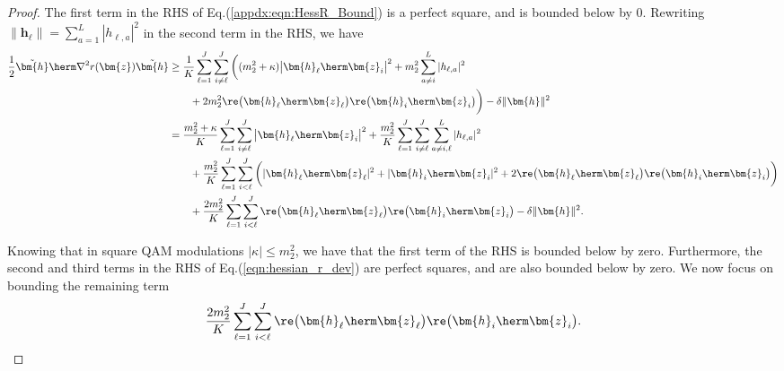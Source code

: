 \begin{proof}
The first term in the RHS of Eq.(\ref{appdx:eqn:HessR_Bound}) is a perfect square, and is bounded below by 0. Rewriting $\|\bm{h}_{\ell}\|=\sum_{a=1}^L|{h}_{{\ell},a}|^2$ in the second term in the RHS, we have
\begin{align}
	\frac{1}{2}\tilde{\bm{h}}\herm\nabla^2 r(\bm{z})\tilde{\bm{h}}
	&\geq\frac{1}{K}\sum_{{\ell}=1}^J  \sum_{i\neq {\ell}}^J\bigg( (m_2^2+
	\kappa)\big|\bm{h}_{\ell}\herm\bm{z}_i\big|^2 +m_2^2\sum_{a\neq i}^L|{h}_{{\ell},a}|^2
	\nonumber\\
	&\qquad +2m_2^2\re\big(\bm{h}_{\ell}\herm \bm{z}_{\ell}\big)\re\big(\bm{h}_i\herm\bm{z}_i\big)\bigg)
	-\delta\|\bm{h}\|^2\nonumber\\
	&=\frac{m_2^2+
		\kappa}{K}\sum_{{\ell}=1}^J\sum_{i\neq {\ell}}^J\big|\bm{h}_{\ell}\herm\bm{z}_i\big|^2 +\frac{m_2^2}{K}
	\sum_{{\ell}=1}^J\sum_{i\neq {\ell}}^J
	\sum_{a\neq i,{\ell}}
	^L|{h}_{{\ell},a}|^2 
		\nonumber\\&\qquad
	+\frac{m_2^2}{K}
	\sum_{{\ell}=1}^J\sum_{i<{\ell}}^J\bigg(|\bm{h}_{\ell}\herm\bm{z}_{\ell}|^2+|\bm{h}_i\herm\bm{z}_i|^2+2\re\big(\bm{h}_{\ell}\herm \bm{z}_{\ell}\big)\re\big(\bm{h}_i\herm\bm{z}_i\big)\bigg)
	\nonumber\\&\qquad
	+\frac{2m_2^2}{K}
	\sum_{{\ell}=1}^J\sum_{i<{\ell}}^J\re\big(\bm{h}_{\ell}\herm \bm{z}_{\ell}\big)\re\big(\bm{h}_i\herm\bm{z}_i\big)
	-\delta\|\bm{h}\|^2.\label{eqn:hessian_r_dev}
\end{align}


Knowing that in square QAM modulations $|\kappa|\leq m_2^2$, we have that the first term of the RHS is bounded below by zero. Furthermore, the second and third terms in the RHS of Eq.(\ref{eqn:hessian_r_dev}) are perfect squares, and are also bounded below by zero. We now focus on bounding the remaining term
\begin{align}
	\frac{2m_2^2}{K}\sum_{{\ell}=1}^J\sum_{i<{\ell}}^J\re\big(\bm{h}_{\ell}\herm \bm{z}_{\ell}\big)\re\big(\bm{h}_i\herm\bm{z}_i\big).\label{eqn:hessian_r_remainingSum}
\end{align}


\end{proof}
